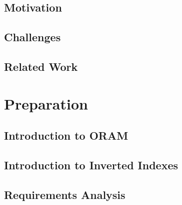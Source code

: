 \documentclass[12pt,a4paper,twoside,openright]{report}
\begin{document}


\section{Motivation}

\section{Challenges}

\section{Related Work}

\chapter{Preparation}







\section{Introduction to ORAM}


\section{Introduction to Inverted Indexes}


\section{Requirements Analysis}
\end{document}
